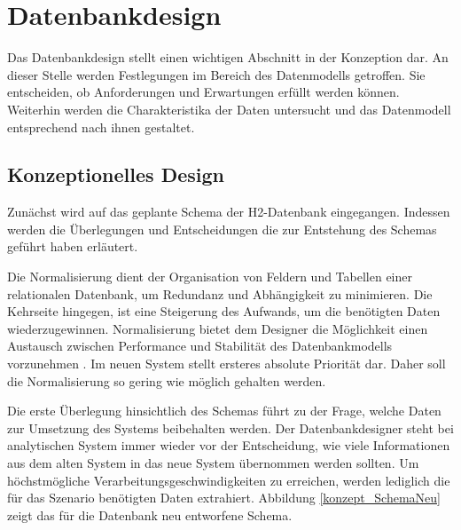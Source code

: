 \section{Datenbankdesign}

Das Datenbankdesign stellt einen wichtigen Abschnitt in der Konzeption dar. An dieser Stelle werden Festlegungen im Bereich des Datenmodells getroffen. Sie entscheiden, ob Anforderungen und Erwartungen erfüllt werden können. Weiterhin werden die Charakteristika der Daten untersucht und das Datenmodell entsprechend nach ihnen gestaltet.

\subsection{Konzeptionelles Design}

Zunächst wird auf das geplante Schema der H2-Datenbank eingegangen. Indessen werden die Überlegungen und Entscheidungen die zur Entstehung des Schemas geführt haben erläutert. 

Die Normalisierung dient der Organisation von Feldern und Tabellen einer relationalen Datenbank, um Redundanz und Abhängigkeit zu minimieren. Die Kehrseite hingegen, ist eine Steigerung des Aufwands, um die benötigten Daten wiederzugewinnen. Normalisierung bietet dem Designer die Möglichkeit einen Austausch zwischen Performance und Stabilität des Datenbankmodells vorzunehmen \cite{geisler2011datenbanken}. Im neuen System stellt ersteres absolute Priorität dar. Daher soll die Normalisierung so gering wie möglich gehalten werden. 

Die erste Überlegung hinsichtlich des Schemas führt zu der Frage, welche Daten zur Umsetzung des Systems beibehalten werden. Der Datenbankdesigner steht bei analytischen System immer wieder vor der Entscheidung, wie viele Informationen aus dem alten System in das neue System übernommen werden sollten. Um höchstmögliche Verarbeitungsgeschwindigkeiten zu erreichen, werden lediglich die für das Szenario benötigten Daten extrahiert. Abbildung \ref{konzept_SchemaNeu} zeigt das für die Datenbank neu entworfene Schema. 

